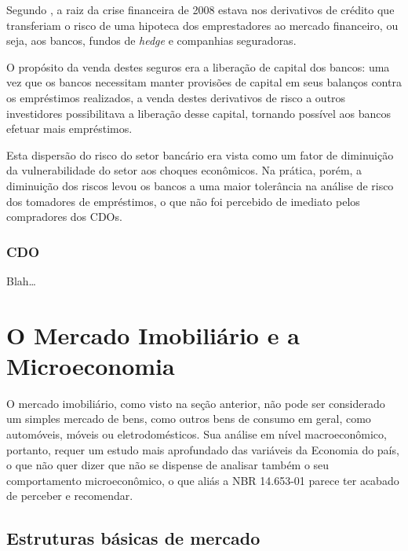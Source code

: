 \documentclass[
	12pt,				%
	oneside,			%
	a4paper,			%
	chapter=TITLE,		%
	section=TITLE,		%
	english,			%
	brazil				%
	]{abntex2}
\begin{document}
Segundo \textcite{devil}, a raiz da crise financeira de 2008 estava nos derivativos de
crédito que transferiam o risco de uma hipoteca dos emprestadores ao mercado
financeiro, ou seja, aos bancos, fundos de \emph{hedge} e companhias seguradoras.

O propósito da venda destes seguros era a liberação de capital dos bancos: uma
vez que os bancos necessitam manter provisões de capital em seus balanços contra
os empréstimos realizados, a venda destes derivativos de risco a outros
investidores possibilitava a liberação desse capital, tornando possível aos
bancos efetuar mais empréstimos.

Esta dispersão do risco do setor bancário era vista como um fator de diminuição
da vulnerabilidade do setor aos choques econômicos. Na prática, porém, a
diminuição dos riscos levou os bancos a uma maior tolerância na análise de
risco dos tomadores de empréstimos, o que não foi percebido de imediato pelos
compradores dos \gls{CDO}s.

\hypertarget{section}{%
\subsubsection{\texorpdfstring{\gls{CDO}}{}}\label{section}}

Blah\ldots{}

\hypertarget{micro}{%
\section{O Mercado Imobiliário e a Microeconomia}\label{micro}}

O mercado imobiliário, como visto na seção anterior, não pode ser
considerado um simples mercado de bens, como outros bens de consumo em geral,
como automóveis, móveis ou eletrodomésticos. Sua análise em nível macroeconômico,
portanto, requer um estudo mais aprofundado das variáveis da Economia do país,
o que não quer dizer que não se dispense de analisar também o seu comportamento
microeconômico, o que aliás a NBR 14.653-01 \autocite*{NBR1465301} parece ter acabado de
perceber e recomendar.

\hypertarget{estruturas-buxe1sicas-de-mercado}{%
\subsection{Estruturas básicas de mercado}\label{estruturas-buxe1sicas-de-mercado}}
\end{document}
